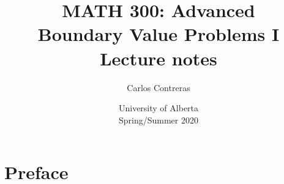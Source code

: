 \documentclass[12pt,oneside]{book}
\title{{\bf MATH 300: Advanced \\ Boundary Value Problems I} \\
Lecture notes}
\author{Carlos Contreras}
\date{University of Alberta \\ Spring/Summer 2020}
\begin{document}
\thispagestyle{empty}

\frontmatter

\maketitle

\tableofcontents


\chapter{Preface}


\mainmatter















\end{document}
